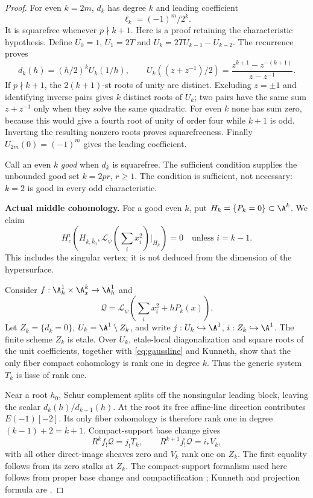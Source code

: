 \begin{proof}
For even $k=2m$, $d_k$ has degree $k$ and leading coefficient
\[
 \ell_k=(-1)^m/2^k.
\]
It is squarefree whenever $p\nmid k+1$.
Here is a proof retaining the characteristic hypothesis.
Define $U_0=1$, $U_1=2T$ and
$U_k=2TU_{k-1}-U_{k-2}$. The recurrence proves
\[
 d_k(h)=(h/2)^kU_k(1/h),\qquad
 U_k((z+z^{-1})/2)
   =\frac{z^{k+1}-z^{-(k+1)}}{z-z^{-1}}.
\]
If $p\nmid k+1$, the $2(k+1)$-st roots of unity are distinct.
Excluding $z=\pm1$ and identifying inverse pairs gives $k$
distinct roots of $U_k$; two pairs have the same sum
$z+z^{-1}$ only when they solve the same quadratic.
For even $k$ none has sum zero, because this would give
a fourth root of unity of order four while $k+1$ is odd.
Inverting the resulting nonzero roots proves squarefreeness.
Finally $U_{2m}(0)=(-1)^m$ gives the leading coefficient.

Call an even $k$ \emph{good} when $d_k$ is squarefree.
The sufficient condition supplies the unbounded good set
$k=2pr$, $r\ge1$. The condition is sufficient, not necessary:
$k=2$ is good in every odd characteristic.

\par\smallskip\noindent\textbf{Actual middle cohomology.}\quad
For a good even $k$, put $H_k=\{P_k=0\}\subset\A^k$.
We claim
\begin{equation}\label{eq:gaussmiddle}
 H_c^i(H_{k,\bar k_0},
       \mathcal L_\psi(\textstyle\sum_i x_i^2)|_{H_k})=0
       \quad\text{unless }i=k-1.
\end{equation}
This includes the singular vertex; it is not deduced from
the dimension of the hypersurface.

Consider $f:\A^1_h\times\A^k_x\to\A^1_h$ and
\[
 \mathscr Q=\mathcal L_\psi(\textstyle\sum_i x_i^2+hP_k(x)).
\]
Let $Z_k=\{d_k=0\}$, $U_k=\A^1\setminus Z_k$, and
write $j:U_k\hookrightarrow\A^1$, $i:Z_k\hookrightarrow\A^1$.
The finite scheme $Z_k$ is etale. Over $U_k$, etale-local
diagonalization and square roots of the unit coefficients,
together with \eqref{eq:gaussline} and Kunneth, show that the
only fiber compact cohomology is rank one in degree $k$.
Thus the generic system $T_k$ is lisse of rank one.

Near a root $h_0$, Schur complement splits off the nonsingular
leading block, leaving the scalar $d_k(h)/d_{k-1}(h)$.
At the root its free affine-line direction contributes
$E(-1)[-2]$. Its only fiber cohomology is therefore rank
one in degree $(k-1)+2=k+1$. Compact-support base change gives
\[
 R^kf_!\mathscr Q=j_!T_k,\qquad
 R^{k+1}f_!\mathscr Q=i_*V_k,
\]
with all other direct-image sheaves zero and $V_k$ rank one
on $Z_k$. The first equality follows from its zero stalks
at $Z_k$. The compact-support formalism used here follows
from proper base change and compactification
\cite[Theorem~17.10, p.~116; Proposition~18.4,
pp.~121--122]{Milne}; Kunneth and projection formula are
\cite[Theorem~22.1, Remarks~22.3(b),(d), and
Proposition~22.5, pp.~135--137]{Milne}.


\end{proof}
